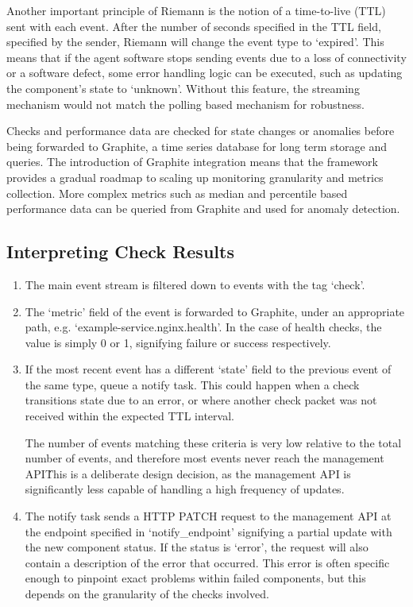 \documentclass{cshonours}
\begin{document}
Another important principle of Riemann is the notion of a time-to-live (TTL) sent with each event. After the number of seconds specified in the TTL field, specified by the sender, Riemann will change the event type to `expired'. This means that if the agent software stops sending events due to a loss of connectivity or a software defect, some error handling logic can be executed, such as updating the component's state to `unknown'. Without this feature, the streaming mechanism would not match the polling based mechanism for robustness.

Checks and performance data are checked for state changes or anomalies before being forwarded to Graphite, a time series database for long term storage and queries. The introduction of Graphite integration means that the framework provides a gradual roadmap to scaling up monitoring granularity and metrics collection. More complex metrics such as median and percentile based performance data can be queried from Graphite and used for anomaly detection.

\subsection{Interpreting Check Results}

\begin{enumerate}
  \item The main event stream is filtered down to events with the tag `check'.
  \item The `metric' field of the event is forwarded to Graphite, under an appropriate path, e.g. `example-service.nginx.health'. In the case of health checks, the value is simply 0 or 1, signifying failure or success respectively.
  \item If the most recent event has a different `state' field to the previous event of the same type, queue a notify task. This could happen when a check transitions state due to an error, or where another check packet was not received within the expected TTL interval.

    The number of events matching these criteria is very low relative to the total number of events, and therefore most events never reach the management API\. This is a deliberate design decision, as the management API is significantly less capable of handling a high frequency of updates.
  \item The notify task sends a HTTP PATCH request to the management API at the endpoint specified in `notify\_endpoint' signifying a partial update with the new component status. If the status is `error', the request will also contain a description of the error that occurred. This error is often specific enough to pinpoint exact problems within failed components, but this depends on the granularity of the checks involved.
\end{enumerate}
\end{document}
